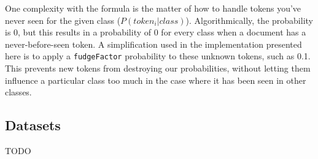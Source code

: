 One complexity with the formula is the matter of how to handle tokens you've never seen for the given
class (\begin{math}P(token_i | class)\end{math}). Algorithmically, the probability is 0, but this results in a
probability of 0 for every class when a document has a never-before-seen token. A simplification used in the
implementation presented here is to apply a \texttt{fudgeFactor} probability to these unknown tokens, such as 0.1.
This prevents new tokens from destroying our probabilities, without letting them influence a particular class too much
in the case where it has been seen in other classes.

\subsection{Datasets}
\label{subsection:datasets}
TODO
